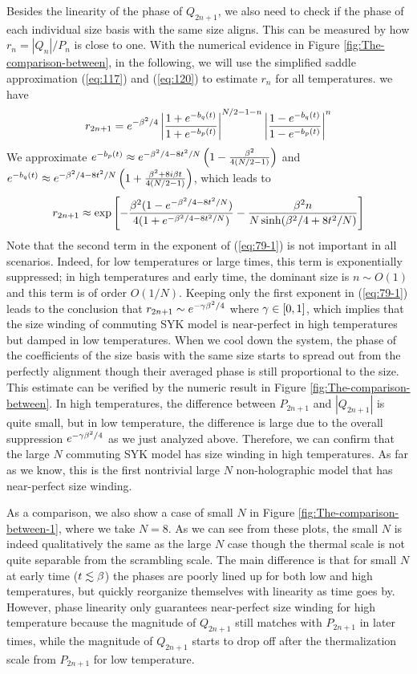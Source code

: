 \documentclass[11pt]{article}
\renewcommand{\>}{\rangle}
\newcommand{\<}{\langle}
\begin{document}
Besides the linearity of the phase of $Q_{2n+1}$, we also need to
check if the phase of each individual size basis with the same size
aligns. This can be measured by how $r_{n}=|Q_{n}|/P_{n}$ is close
to one. With the numerical evidence in Figure \ref{fig:The-comparison-between},
in the following, we will use the simplified saddle approximation (\ref{eq:117})
and (\ref{eq:120}) to estimate $r_{n}$ for all temperatures. we
have
\begin{equation}
r_{2n+1}=e^{-\beta^{2}/4}\left|\frac{1+e^{-b_{q}(t)}}{1+e^{-b_{p}(t)}}\right|^{N/2-1-n}\left|\frac{1-e^{-b_{q}(t)}}{1-e^{-b_{p}(t)}}\right|^{n}
\end{equation}
We approximate $e^{-b_{p}(t)}\approx e^{-\beta^{2}/4-8t^{2}/N}\left(1-\frac{\beta^{2}}{4(N/2-1)}\right)$
and $e^{-b_{q}(t)}\approx e^{-\beta^{2}/4-8t^{2}/N}\left(1+\frac{\beta^{2}+8i\beta t}{4(N/2-1)}\right)$,
which leads to
\begin{equation}
r_{2n+1}\approx\exp\left[-\frac{\beta^{2}(1-e^{-\beta^{2}/4-8t^{2}/N})}{4(1+e^{-\beta^{2}/4-8t^{2}/N})}-\frac{\beta^{2}n}{N\sinh(\beta^{2}/4+8t^{2}/N)}\right]\label{eq:79-1}
\end{equation}
Note that the second term in the exponent of (\ref{eq:79-1}) is not
important in all scenarios. Indeed, for low temperatures or large times,
this term is exponentially suppressed; in high temperatures and early
time, the dominant size is $n\sim O(1)$ and this term is of order
$O(1/N)$. Keeping only the first exponent in (\ref{eq:79-1}) leads
to the conclusion that $r_{2n+1}\sim e^{-\gamma\beta^{2}/4}$ where
$\gamma\in[0,1]$, which implies that the size winding of commuting SYK
model is near-perfect in high temperatures but damped in low temperatures.
When we cool down the system, the phase of the coefficients of the
size basis with the same size starts to spread out from the perfectly
alignment though their averaged phase is still proportional to the
size. This estimate can be verified by the numeric result in Figure
\ref{fig:The-comparison-between}. In high temperatures, the difference
between $P_{2n+1}$ and $|Q_{2n+1}|$ is quite small, but in low temperature,
the difference is large due to the overall suppression $e^{-\gamma\beta^{2}/4}$
as we just analyzed above. Therefore, we can confirm that the large
$N$ commuting SYK model has size winding in high temperatures. As
far as we know, this is the first nontrivial large $N$ non-holographic model that has near-perfect size winding.

As a comparison, we also show a case of small $N$ in Figure \ref{fig:The-comparison-between-1},
where we take $N=8$. As we can see from these plots, the small $N$
is indeed qualitatively the same as the large $N$ case though the
thermal scale is not quite separable from the scrambling scale. The
main difference is that for small $N$ at early time ($t\lesssim\beta$)
the phases are poorly lined up for both low and high temperatures,
but quickly reorganize themselves with linearity as time goes by.
However, phase linearity only guarantees near-perfect size winding
for high temperature because the magnitude of $Q_{2n+1}$ still matches
with $P_{2n+1}$ in later times, while the magnitude of $Q_{2n+1}$
starts to drop off after the thermalization scale from $P_{2n+1}$ for
low temperature. 
\end{document}
